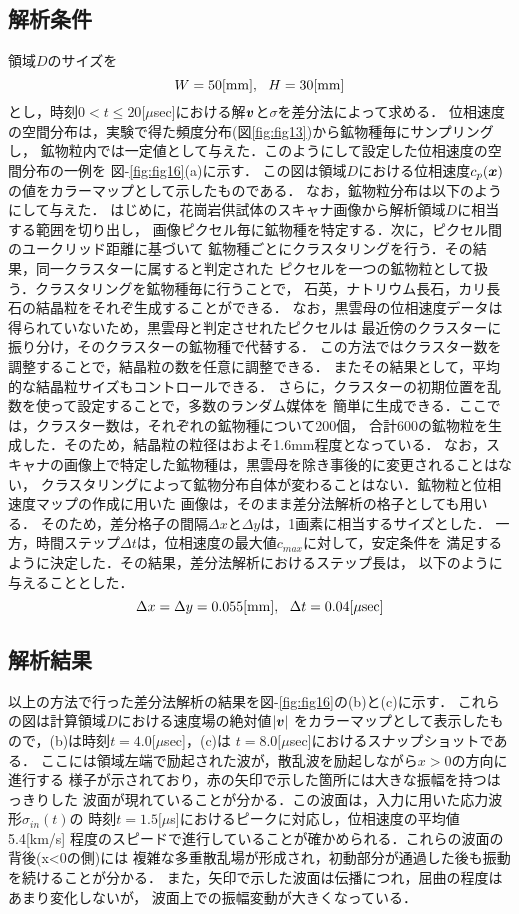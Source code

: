 \subsection{解析条件}
領域$D$のサイズを
\begin{equation}
	W=50[{\rm mm}], \ \  H=30[{\rm mm}]
	\label{eqn:dom_size}
\end{equation}
とし，時刻$ 0 <t\leq 20[\mu$sec]における解$\mbox{\boldmath{$v$}}$と$\sigma$を差分法によって求める．
位相速度の空間分布は，実験で得た頻度分布(図\ref{fig:fig13})から鉱物種毎にサンプリングし，
鉱物粒内では一定値として与えた．このようにして設定した位相速度の空間分布の一例を
図-\ref{fig:fig16}(a)に示す．
この図は領域$D$における位相速度$c_p(\mbox{\boldmath{$x$}})$の値をカラーマップとして示したものである．
なお，鉱物粒分布は以下のようにして与えた．
はじめに，花崗岩供試体のスキャナ画像から解析領域$D$に相当する範囲を切り出し，
画像ピクセル毎に鉱物種を特定する．次に，ピクセル間のユークリッド距離に基づいて
鉱物種ごとにクラスタリングを行う．その結果，同一クラスターに属すると判定された
ピクセルを一つの鉱物粒として扱う．クラスタリングを鉱物種毎に行うことで，
石英，ナトリウム長石，カリ長石の結晶粒をそれぞ生成することができる．
なお，黒雲母の位相速度データは得られていないため，黒雲母と判定させれたピクセルは
最近傍のクラスターに振り分け，そのクラスターの鉱物種で代替する．
この方法ではクラスター数を調整することで，結晶粒の数を任意に調整できる．
またその結果として，平均的な結晶粒サイズもコントロールできる．
さらに，クラスターの初期位置を乱数を使って設定することで，多数のランダム媒体を
簡単に生成できる．ここでは，クラスター数は，それぞれの鉱物種について200個，
合計600の鉱物粒を生成した．そのため，結晶粒の粒径はおよそ1.6mm程度となっている．
なお，スキャナの画像上で特定した鉱物種は，黒雲母を除き事後的に変更されることはない，
クラスタリングによって鉱物分布自体が変わることはない．鉱物粒と位相速度マップの作成に用いた
画像は，そのまま差分法解析の格子としても用いる．
そのため，差分格子の間隔$\Delta x$と$\Delta y$は，1画素に相当するサイズとした．
一方，時間ステップ$\Delta t$は，位相速度の最大値$c_{max}$に対して，安定条件を
満足するように決定した．その結果，差分法解析におけるステップ長は，
以下のように与えることとした．
\begin{equation}
	\Delta x = \Delta y= 0.055[{\rm mm}], \ \ \Delta t=0.04[\mu{\rm sec}]
	\label{eqn:}
\end{equation}
\subsection{解析結果}
以上の方法で行った差分法解析の結果を図-\ref{fig:fig16}の(b)と(c)に示す．
これらの図は計算領域$D$における速度場の絶対値$\left| \mbox{\boldmath{$v$}}\right|$
をカラーマップとして表示したもので，(b)は時刻$t=4.0[\mu$sec]，(c)は
$t=8.0[\mu$sec]におけるスナップショットである．
ここには領域左端で励起された波が，散乱波を励起しながら$x>0$の方向に進行する
様子が示されており，赤の矢印で示した箇所には大きな振幅を持つはっきりした
波面が現れていることが分かる．この波面は，入力に用いた応力波形$\sigma_{in}(t)$の
時刻$t=1.5[\mu$s]におけるピークに対応し，位相速度の平均値5.4[km/s]
程度のスピードで進行していることが確かめられる．これらの波面の背後(x<0の側)には
複雑な多重散乱場が形成され，初動部分が通過した後も振動を続けることが分かる．
また，矢印で示した波面は伝播につれ，屈曲の程度はあまり変化しないが，
波面上での振幅変動が大きくなっている．
